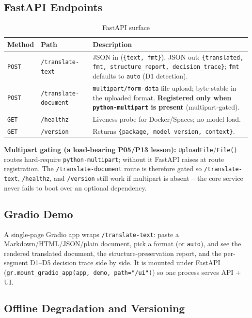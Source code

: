 \documentclass[12pt,a4paper]{article}
\begin{document}
\subsection{FastAPI Endpoints}

\begin{table}[H]
\centering
\caption{FastAPI surface}
\small
\begin{tabularx}{\linewidth}{@{} l l L @{}}
\toprule
\textbf{Method} & \textbf{Path} & \textbf{Description} \\
\midrule
\texttt{POST} & \texttt{/translate-text} & JSON in (\texttt{\{text, fmt\}}), JSON out: \texttt{\{translated, fmt, structure\_report, decision\_trace\}}; \texttt{fmt} defaults to \texttt{auto} (D1 detection). \\
\texttt{POST} & \texttt{/translate-document} & \texttt{multipart/form-data} file upload; byte-stable in the uploaded format. \textbf{Registered only when \texttt{python-multipart} is present} (multipart-gated). \\
\texttt{GET} & \texttt{/healthz} & Liveness probe for Docker/Spaces; no model load. \\
\texttt{GET} & \texttt{/version} & Returns \texttt{\{package, model\_version, context\}}. \\
\bottomrule
\end{tabularx}
\end{table}

\textbf{Multipart gating (a load-bearing P05/P13 lesson):} \texttt{UploadFile}/\texttt{File()} routes hard-require \texttt{python-multipart}; without it FastAPI raises at route registration. The \texttt{/translate-document} route is therefore gated so \texttt{/translate-text}, \texttt{/healthz}, and \texttt{/version} still work if multipart is absent -- the core service never fails to boot over an optional dependency.

\subsection{Gradio Demo}

A single-page Gradio app wraps \texttt{/translate-text}: paste a Markdown/HTML/JSON/plain document, pick a format (or \texttt{auto}), and see the rendered translated document, the structure-preservation report, and the per-segment D1--D5 decision trace side by side. It is mounted under FastAPI (\texttt{gr.mount\_gradio\_app(app, demo, path="/ui")}) so one process serves API + UI.

\subsection{Offline Degradation and Versioning}
\end{document}
